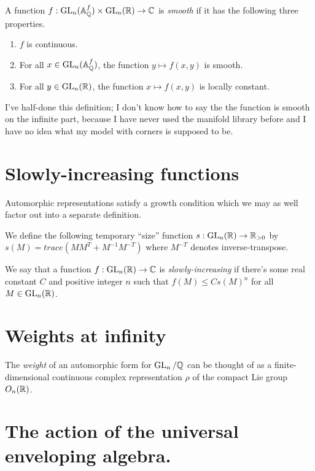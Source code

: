 \begin{definition} A function $f:\operatorname{GL}_n(\mathbb{A}_{\mathbb{Q}}^f)\times\operatorname{GL}_n(\mathbb{R})\to\mathbb{C}$ is \emph{smooth}
  if it has the following three properties.

  \begin{enumerate}
    \item $f$ is continuous.
    \item For all $x\in\operatorname{GL}_n(\mathbb{A}_{\mathbb{Q}}^f)$, the function $y\mapsto f(x,y)$ is smooth.
    \item For all $y\in\operatorname{GL}_n(\mathbb{R})$, the function $x\mapsto f(x,y)$ is locally constant.
  \end{enumerate}
\end{definition}

I've half-done this definition; I don't know how to say the the function is smooth
on the infinite part, because I have never used the manifold library before and I have
no idea what my model with corners is supposed to be.

\section{Slowly-increasing functions}

Automorphic representations satisfy a growth condition which we may as well factor out
into a separate definition.

We define the following temporary ``size'' function $s:\operatorname{GL}_n(\mathbb{R})\to\mathbb{R}_{>0}$ by
$s(M)=trace(MM^T+M^{-1}M^{-T})$ where $M^{-T}$ denotes inverse-transpose.

\begin{definition} We say that a function $f:\operatorname{GL}_n(\mathbb{R})\to\mathbb{C}$ is \emph{slowly-increasing}
  if there's some real constant $C$ and positive integer $n$ such that $f(M)\leq Cs(M)^n$
  for all $M\in\operatorname{GL}_n(\mathbb{R})$.
\end{definition}

\section{Weights at infinity}

The \emph{weight} of an automorphic form for $\operatorname{GL}_n/\mathbb{Q}$ can be thought of as a finite-dimensional
continuous complex representation $\rho$ of the compact Lie group $O_n(\mathbb{R})$.

\section{The action of the universal enveloping algebra.}

